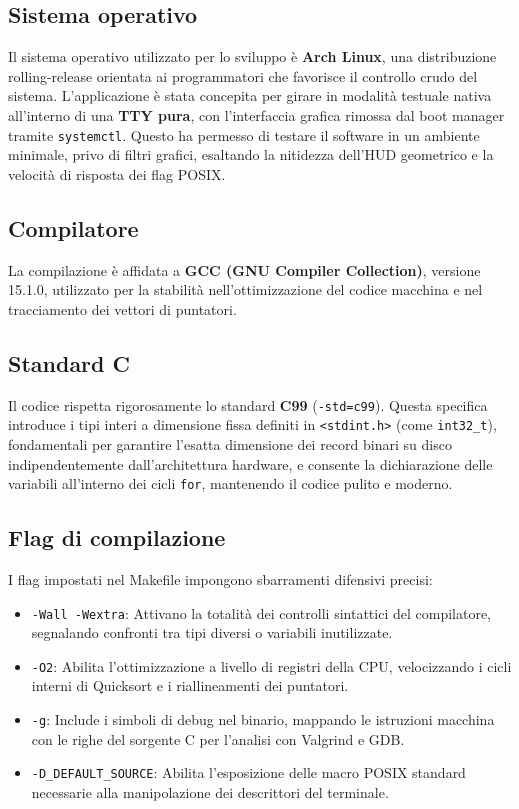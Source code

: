 \documentclass[12pt, a4paper]{article}
\begin{document}
\subsection{Sistema operativo}
Il sistema operativo utilizzato per lo sviluppo è \textbf{Arch Linux}, una distribuzione rolling-release orientata ai programmatori che favorisce il controllo crudo del sistema. L'applicazione è stata concepita per girare in modalità testuale nativa all'interno di una \textbf{TTY pura}, con l'interfaccia grafica rimossa dal boot manager tramite \texttt{systemctl}. Questo ha permesso di testare il software in un ambiente minimale, privo di filtri grafici, esaltando la nitidezza dell'HUD geometrico e la velocità di risposta dei flag POSIX.

\subsection{Compilatore}
La compilazione è affidata a \textbf{GCC (GNU Compiler Collection)}, versione 15.1.0, utilizzato per la stabilità nell'ottimizzazione del codice macchina e nel tracciamento dei vettori di puntatori.

\subsection{Standard C}
Il codice rispetta rigorosamente lo standard \textbf{C99} (\texttt{-std=c99}). Questa specifica introduce i tipi interi a dimensione fissa definiti in \texttt{<stdint.h>} (come \texttt{int32\_t}), fondamentali per garantire l'esatta dimensione dei record binari su disco indipendentemente dall'architettura hardware, e consente la dichiarazione delle variabili all'interno dei cicli \texttt{for}, mantenendo il codice pulito e moderno.

\subsection{Flag di compilazione}
I flag impostati nel Makefile impongono sbarramenti difensivi precisi:
\begin{itemize}[noitemsep]
    \item \texttt{-Wall -Wextra}: Attivano la totalità dei controlli sintattici del compilatore, segnalando confronti tra tipi diversi o variabili inutilizzate.
    \item \texttt{-O2}: Abilita l'ottimizzazione a livello di registri della CPU, velocizzando i cicli interni di Quicksort e i riallineamenti dei puntatori.
    \item \texttt{-g}: Include i simboli di debug nel binario, mappando le istruzioni macchina con le righe del sorgente C per l'analisi con Valgrind e GDB.
    \item \texttt{-D\_DEFAULT\_SOURCE}: Abilita l'esposizione delle macro POSIX standard necessarie alla manipolazione dei descrittori del terminale.
\end{itemize}
\end{document}

